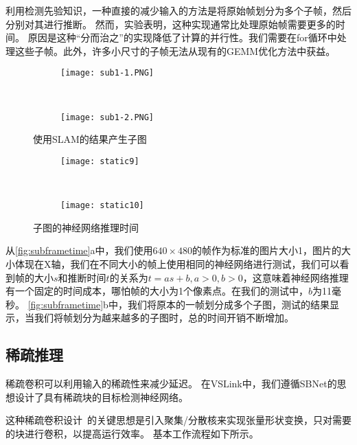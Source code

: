 利用检测先验知识，一种直接的减少输入的方法是将原始帧划分为多个子帧，然后分别对其进行推断。
然而，实验表明，这种实现通常比处理原始帧需要更多的时间。
原因是这种“分而治之”的实现降低了计算的并行性。我们需要在for循环中处理这些子帧。此外，许多小尺寸的子帧无法从现有的GEMM优化方法中获益。

\begin{figure}[htbp]
	\centering
	\begin{subfigure}{.45\linewidth}
		\texttt{[image: sub1-1.PNG]}
		\caption{}
	\end{subfigure}
	\ 
	\ 
	\ 
	\begin{subfigure}{.45\linewidth}
		\texttt{[image: sub1-2.PNG]}
		\caption{}
	\end{subfigure}
	\caption{使用SLAM的结果产生子图}\label{fig:NN for subgraph}
\end{figure}

\begin{figure}[htb]
	\centering
	\begin{subfigure}{.48\linewidth}
		\texttt{[image: static9]}
		\caption{}
	\end{subfigure}
	\ 
	\begin{subfigure}{.48\linewidth}
		\texttt{[image: static10]}
		\caption{}
	\end{subfigure}
	\caption{子图的神经网络推理时间}\label{fig:subframetime}
\end{figure}

从\autoref{fig:subframetime}a中，我们使用$640\times 480$的帧作为标准的图片大小1，图片的大小体现在X轴，我们在不同大小的帧上使用相同的神经网络进行测试，我们可以看到帧的大小$s$和推断时间$t$的关系为$t = as + b, a>0,b >0$，这意味着神经网络推理有一个固定的时间成本，哪怕帧的大小为1个像素点。在我们的测试中，$b$为11毫秒。
\autoref{fig:subframetime}b中，我们将原本的一帧划分成多个子图，测试的结果显示，当我们将帧划分为越来越多的子图时，总的时间开销不断增加。
 
\subsection{稀疏推理}
稀疏卷积\cite{graham2015sparse,ren2018sbnet}可以利用输入的稀疏性来减少延迟。
在VSLink中，我们遵循SBNet\cite{ren2018sbnet}的思想设计了具有稀疏块的目标检测神经网络。

这种稀疏卷积设计~\cite{ren2018sbnet}的关键思想是引入聚集/分散核来实现张量形状变换，只对需要的块进行卷积，以提高运行效率。
基本工作流程如下所示。

